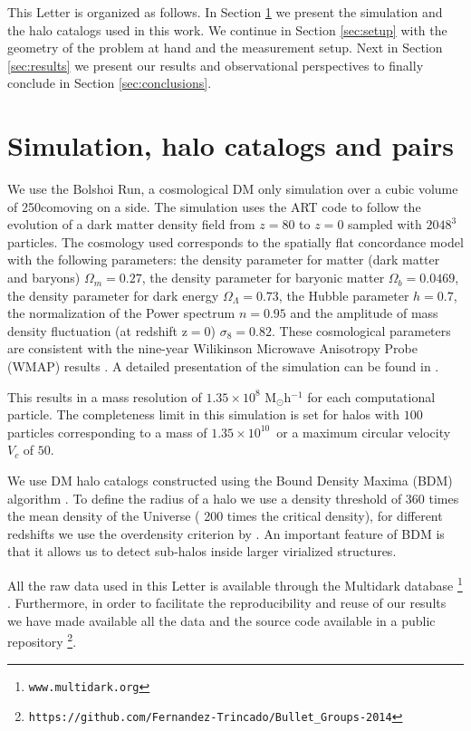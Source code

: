 \documentclass{emulateapj}
\newcommand{\hMpc}{{\ifmmode{h^{-1}{\rm Mpc}}\else{$h^{-1}$Mpc }\fi}}
\newcommand{\hMsun}{{\ifmmode{h^{-1}{\rm {M_{\odot}}}}\else{$h^{-1}{\rm{M_{\odot}}}$}\fi}}
\newcommand{\kms}{{\ifmmode{{\mathrm{\,km\ s}^{-1}}}\else{\,km~s$^{-1}$}\fi}}
\begin{document}
This Letter is organized as follows. In Section
\ref{sec:simulation} we present the simulation and the halo catalogs
used in this work. We continue in Section \ref{sec:setup} with the
geometry of the problem at hand and the measurement setup. Next in
Section \ref{sec:results} we present our results and observational
perspectives to finally conclude in Section \ref{sec:conclusions}. 

\section{Simulation, halo catalogs and pairs}
\label{sec:simulation}

We use the Bolshoi Run, a cosmological DM only simulation over a cubic
volume of 250\hMpc comoving on a side. The simulation uses the ART
code \citep{Kravtsov1997} to follow the evolution of a dark matter
density field from $z=80$ to $z=0$ sampled with $2048^3$  particles. The
cosmology used  corresponds to  the spatially flat concordance model
with the following parameters:  the density parameter for matter (dark
matter and baryons) $\Omega_m=0.27$, the density parameter for baryonic matter
$\Omega_b=0.0469$, the density parameter for dark energy
$\Omega_{\Lambda}=0.73$, the Hubble parameter $h=0.7$, the
normalization of the Power spectrum $n=0.95$ and the amplitude of mass
density fluctuation (at redshift z$=$0) $\sigma_8=0.82$.  These
cosmological parameters are consistent with the nine-year Wilikinson
Microwave Anisotropy Probe (WMAP) results \citep{hinshaw_etal13}. A
detailed presentation of the simulation can be found in \citet{2011ApJ...740..102K}.     

This results in a mass resolution of $1.35 \times 10^8$
M$_{\odot}$h$^{-1}$ for each computational particle. The completeness
limit in this simulation is set for halos with $100$ particles
corresponding to a mass of $1.35\times10^{10}$\hMsun\ or a maximum
circular velocity $V_{c}$ of $50$\kms. 

We use DM halo catalogs constructed using the Bound Density Maxima (BDM)
algorithm \citep{BDM,BDMb}. To define the radius of a halo we use a
density threshold of 360 times the mean density of the Universe (
200 times the critical density), for different redshifts we use the
overdensity criterion by \cite{Bryan1998}. An important feature of BDM
is that it allows us to detect sub-halos inside larger virialized
structures.  

All the raw data used in this Letter is available through the Multidark database \footnote{\texttt{www.multidark.org}}
\citep{Riebe2013}.  Furthermore, in order to facilitate the
reproducibility and reuse of our results we have made available all
the data and the source code available in a public
repository \footnote{\texttt{https://github.com/Fernandez-Trincado/Bullet\_Groups-2014}}.
\end{document}
